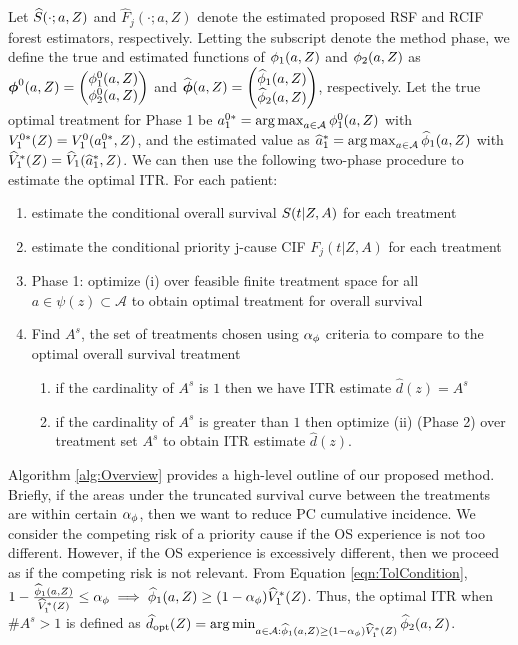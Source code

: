 Let $\widehat{S}(\cdot;a,Z)$ and $\widehat{F}_j(\cdot;a,Z)$ denote the estimated proposed RSF and RCIF forest estimators, respectively. 
Letting the subscript denote the method phase, we define the true and estimated functions of $\phi_1(a,Z)$ and $\phi_2(a,Z)$ as $\boldsymbol{\phi}^0(a,Z) = \begin{pmatrix}\phi_1^0(a,Z) \\ \phi_2^0(a,Z) \end{pmatrix}$ and $\widehat{\boldsymbol{\phi}}(a,Z) = \begin{pmatrix} \widehat{\phi}_1(a,Z) \\ \widehat{\phi}_2(a,Z) \end{pmatrix}$, respectively.
Let the true optimal treatment for Phase 1 be $a_1^{0*} = \operatorname*{arg\,max}_{a \in \mathcal{A}} \phi_1^0(a,Z)$ with $V_1^{0*}(Z) = V_1^0(a_1^{0*},Z)$, and the estimated value as $\widehat{a}_1^* = \operatorname*{arg\,max}_{a \in \mathcal{A}} \widehat{\phi}_1(a,Z)$ with
$\widehat{V}_1^*(Z) = \widehat{V}_1(\widehat{a}_1^*,Z)$. We can then use the following two-phase procedure to estimate the optimal ITR. For each patient:
\begin{enumerate}
    \item[(i)] estimate the conditional overall survival $S(t|Z,A)$ for each treatment
    \item[(ii)] estimate the conditional priority j-cause CIF $F_{j}(t|Z,A)$ for each treatment
    \item[(iii)] Phase 1: optimize (i) over feasible finite treatment space for all \(a \in \psi(z) \subset \mathcal{A}\) to obtain optimal treatment for overall survival
    \item[(iv)] Find $A^s$, the set of treatments chosen using $\alpha_{\phi}$ criteria to compare to the optimal overall survival treatment
    \begin{enumerate}
        \item if the cardinality of $A^s$ is $1$ then we have ITR estimate $\widehat{d}(z) = A^s$
        \item if the cardinality of $A^s$ is greater than $1$ then optimize (ii) (Phase 2) over treatment set $A^s$ to obtain ITR estimate $\widehat{d}(z)$.
    \end{enumerate}
\end{enumerate}



Algorithm \ref{alg:Overview} provides a high-level outline of our proposed method. Briefly, if the areas under the truncated survival curve between the treatments are within certain $\alpha_{\phi}$, then we want to reduce PC cumulative incidence. We consider the competing risk of a priority cause if the OS experience is not too different. However, if the OS experience is excessively different, then we proceed as if the competing risk is not relevant. From Equation \cref{eqn:TolCondition}, $1 - \frac{\widehat{\phi}_1(a,Z)}{\widehat{V}_1^*(Z)} \le \alpha_{\phi} \implies \widehat{\phi}_1(a,Z) \ge (1-\alpha_{\phi})\widehat{V}_1^*(Z)$. Thus, the optimal ITR when $\#A^s > 1$ is defined as $\widehat{d}_{\text{opt}}(Z) = \operatorname*{arg\,min}_{a \in \mathcal{A}:\widehat{\phi}_1(a,Z) \ge (1-\alpha_{\phi})\widehat{V}_1^*(Z)} \widehat{\phi}_2(a,Z)$.
